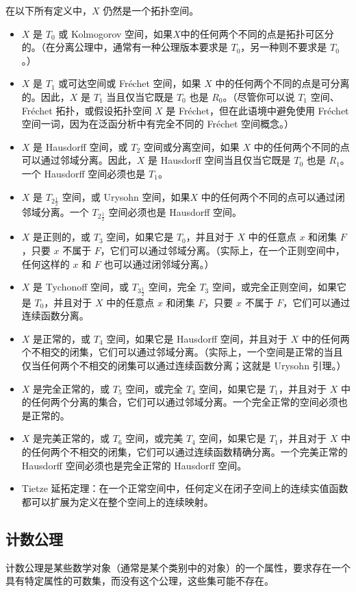 在以下所有定义中，$X$ 仍然是一个拓扑空间。
\begin{itemize}
\item $X$ 是 $T_0$ 或 Kolmogorov 空间，如果$X$中的任何两个不同的点是拓扑可区分的。（在分离公理中，通常有一种公理版本要求是 $T_0$，另一种则不要求是 $T_0$。）
\item $X$ 是 $T_1$ 或可达空间或 Fréchet 空间，如果 $X$ 中的任何两个不同的点是可分离的。因此，$X$ 是 $T_1$ 当且仅当它既是 $T_0$ 也是 $R_0$。（尽管你可以说 $T_1$ 空间、Fréchet 拓扑，或假设拓扑空间 $X$ 是 Fréchet，但在此语境中避免使用 Fréchet 空间一词，因为在泛函分析中有完全不同的 Fréchet 空间概念。）
\item $X$ 是 Hausdorff 空间，或 $T_2$ 空间或分离空间，如果 $X$ 中的任何两个不同的点可以通过邻域分离。因此，$X$ 是 Hausdorff 空间当且仅当它既是 $T_0$ 也是 $R_1$。一个 Hausdorff 空间必须也是 $T_1$。
\item $X$ 是 $T_{2\frac{1}{2}}$ 空间，或 Urysohn 空间，如果$X$ 中的任何两个不同的点可以通过闭邻域分离。一个 $T_{2\frac{1}{2}}$ 空间必须也是 Hausdorff 空间。
\item $X$ 是正则的，或 $T_3$ 空间，如果它是 $T_0$，并且对于 $X$ 中的任意点 $x$ 和闭集 $F$，只要 $x$ 不属于 $F$，它们可以通过邻域分离。（实际上，在一个正则空间中，任何这样的 $x$ 和 $F$ 也可以通过闭邻域分离。）
\item $X$ 是 Tychonoff 空间，或 $T_{3\frac{1}{2}}$ 空间，完全 $T_3$ 空间，或完全正则空间，如果它是 $T_0$，并且对于 $X$ 中的任意点 $x$ 和闭集 $F$，只要 $x$ 不属于 $F$，它们可以通过连续函数分离。
\item $X$ 是正常的，或 $T_4$ 空间，如果它是 Hausdorff 空间，并且对于 $X$ 中的任何两个不相交的闭集，它们可以通过邻域分离。（实际上，一个空间是正常的当且仅当任何两个不相交的闭集可以通过连续函数分离；这就是 Urysohn 引理。）
\item $X$ 是完全正常的，或 $T_5$ 空间，或完全 $T_4$ 空间，如果它是 $T_1$，并且对于 $X$ 中的任何两个分离的集合，它们可以通过邻域分离。一个完全正常的空间必须也是正常的。
\item $X$ 是完美正常的，或 $T_6$ 空间，或完美 $T_4$ 空间，如果它是 $T_1$，并且对于 $X$ 中的任何两个不相交的闭集，它们可以通过连续函数精确分离。一个完美正常的 Hausdorff 空间必须也是完全正常的 Hausdorff 空间。
\item Tietze 延拓定理：在一个正常空间中，任何定义在闭子空间上的连续实值函数都可以扩展为定义在整个空间上的连续映射。
\end{itemize}
\subsection{计数公理}
计数公理是某些数学对象（通常是某个类别中的对象）的一个属性，要求存在一个具有特定属性的可数集，而没有这个公理，这些集可能不存在。

